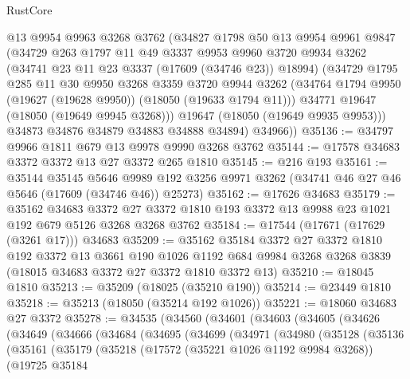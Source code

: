 \begin{lexlean}{RustCore}
\begin{coremodule}
        @13
        @9954
        @9963
        @3268
        @3762
        (@34827
          @1798
          @50
          @13
          @9954
          @9961
          @9847
          (@34729
            @263
            @1797
            @11
            @49
            @3337
            @9953
            @9960
            @3720
            @9934
            @3262
            (@34741 @23 @11 @23 @3337 (@17609 (@34746 @23)) @18994)
            (@34729
              @1795
              @285
              @11
              @30
              @9950
              @3268
              @3359
              @3720
              @9944
              @3262
              (@34764 @1794 @9950 (@19627 (@19628 @9950)) (@18050 (@19633 @1794 @11)))
              @34771
              @19647
              (@18050 (@19649 @9945 @3268)))
            @19647
            (@18050 (@19649 @9935 @9953)))
          @34873
          @34876
          @34879
          @34883
          @34888
          @34894)
        @34966))
@35136 := @34797 @9966 @1811 @679 @13 @9978 @9990 @3268 @3762
@35144 := @17578 @34683 @3372 @3372 @13 @27 @3372 @265 @1810
@35145 := @216 @193
@35161 := @35144
    @35145
    @5646
    @9989
    @192
    @3256
    @9971
    @3262
    (@34741 @46 @27 @46 @5646 (@17609 (@34746 @46)) @25273)
@35162 := @17626 @34683
@35179 := @35162
    @34683
    @3372
    @27
    @3372
    @1810
    @193
    @3372
    @13
    @9988
    @23
    @1021
    @192
    @679
    @5126
    @3268
    @3268
    @3762
@35184 := @17544 (@17671 (@17629 (@3261 @17))) @34683
@35209 := @35162
    @35184
    @3372
    @27
    @3372
    @1810
    @192
    @3372
    @13
    @3661
    @190
    @1026
    @1192
    @684
    @9984
    @3268
    @3268
    @3839
    (@18015 @34683 @3372 @27 @3372 @1810 @3372 @13)
@35210 := @18045 @1810
@35213 := @35209 (@18025 (@35210 @190))
@35214 := @23449 @1810
@35218 := @35213 (@18050 (@35214 @192 @1026))
@35221 := @18060 @34683 @27 @3372
@35278 := @34535
    (@34560
      (@34601
        (@34603
          (@34605
            (@34626
              (@34649
                (@34666
                  (@34684
                    (@34695
                      (@34699
                        (@34971
                          (@34980
                            (@35128
                              (@35136
                                (@35161
                                  (@35179
                                    (@35218
                                      (@17572 (@35221 @1026 @1192 @9984 @3268))
                                      (@19725
                                        @35184

\end{coremodule}
\end{lexlean}
